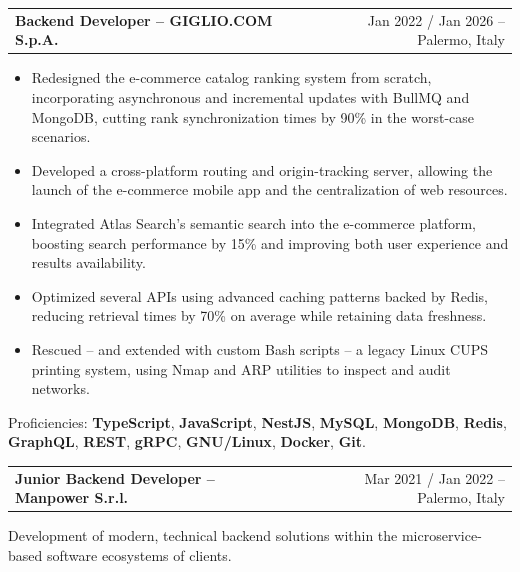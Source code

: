 \documentclass[a4paper,10pt]{article}
\makeatletter
\newenvironment{jobshort}[2]
    {
    \begin{tabularx}{\linewidth}{@{}l X r@{}}
        \textbf{#1} & \hfill & {\footnotesize #2} \\[0.5pt]
    \end{tabularx}
    }
    {
    }
\newenvironment{joblong}[2]
    {
    \begin{tabularx}{\linewidth}{@{}l X r@{}}
    \textbf{#1} & \hfill & {\footnotesize #2} \\[0.5pt]
    \end{tabularx}
    \begin{minipage}[t]{\linewidth}
    \begin{itemize}[nosep,after=\strut, leftmargin=1em, itemsep=1pt,label=$\circ$]
    }
    {
    \end{itemize}
    \end{minipage}    
    }
\makeatother
\begin{document}
\begin{joblong}{Backend Developer -- GIGLIO.COM S.p.A.}{Jan 2022 / Jan 2026 -- Palermo, Italy}
    \item Redesigned the e-commerce catalog ranking system from scratch, incorporating asynchronous and incremental updates with BullMQ and MongoDB, cutting rank synchronization times by 90\% in the worst-case scenarios.
    \item Developed a cross-platform routing and origin-tracking server, allowing the launch of the e-commerce mobile app and the centralization of web resources.
    \item Integrated Atlas Search’s semantic search into the e-commerce platform, boosting search performance by 15\% and improving both user experience and results availability.
    \item Optimized several APIs using advanced caching patterns backed by Redis, reducing retrieval times by 70\% on average while retaining data freshness.
    \item Rescued -- and extended with custom Bash scripts -- a legacy Linux CUPS printing system, using Nmap and ARP utilities to inspect and audit networks.
\end{joblong}

\vspace{-8pt}
Proficiencies: {\footnotesize \textbf{TypeScript}, \textbf{JavaScript}, \textbf{NestJS}, \textbf{MySQL}, \textbf{MongoDB}, \textbf{Redis}, \textbf{GraphQL}, \textbf{REST}, \textbf{gRPC}, \textbf{GNU/Linux}, \textbf{Docker}, \textbf{Git}.}

\begin{jobshort}{Junior Backend Developer -- Manpower S.r.l.}{Mar 2021 / Jan 2022 -- Palermo, Italy}
Development of modern, technical backend solutions within the microservice-based software ecosystems of clients.
\end{jobshort}
  
\end{document}
